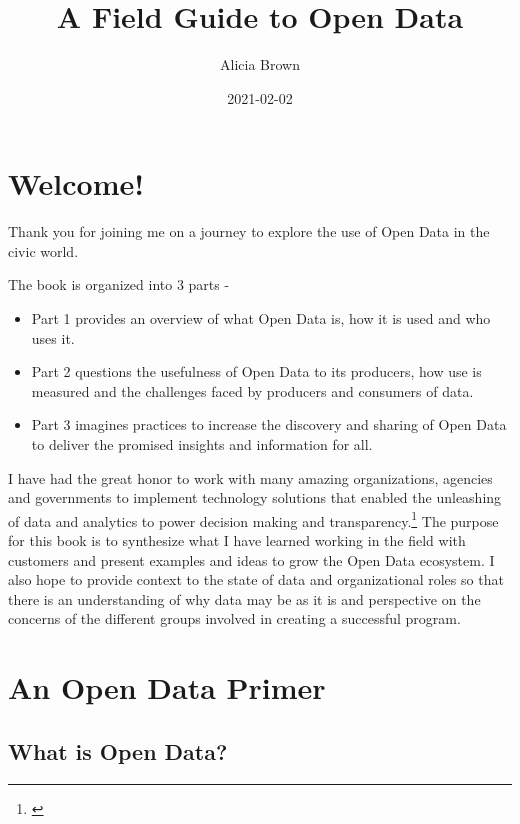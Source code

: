 \documentclass[
  openany]{book}
\title{A Field Guide to Open Data}
\author{Alicia Brown}
\date{2021-02-02}
\providecommand{\tightlist}{%
  \setlength{\itemsep}{0pt}\setlength{\parskip}{0pt}}
\begin{document}
\maketitle

{
\setcounter{tocdepth}{1}
\tableofcontents
}
\hypertarget{welcome}{%
\chapter{Welcome!}\label{welcome}}

Thank you for joining me on a journey to explore the use of Open Data in the civic world.

The book is organized into 3 parts -

\begin{itemize}
\tightlist
\item
  Part 1 provides an overview of what Open Data is, how it is used and who uses it.
\item
  Part 2 questions the usefulness of Open Data to its producers, how use is measured and the challenges faced by producers and consumers of data.
\item
  Part 3 imagines practices to increase the discovery and sharing of Open Data to deliver the promised insights and information for all.
\end{itemize}

I have had the great honor to work with many amazing organizations, agencies and governments to implement technology solutions that enabled the unleashing of data and analytics to power decision making and transparency.\footnote{\citet{blog5years}} The purpose for this book is to synthesize what I have learned working in the field with customers and present examples and ideas to grow the Open Data ecosystem. I also hope to provide context to the state of data and organizational roles so that there is an understanding of why data may be as it is and perspective on the concerns of the different groups involved in creating a successful program.

\hypertarget{overview}{%
\chapter{An Open Data Primer}\label{overview}}

\hypertarget{what-is-open-data}{%
\section{What is Open Data?}\label{what-is-open-data}}
\end{document}
